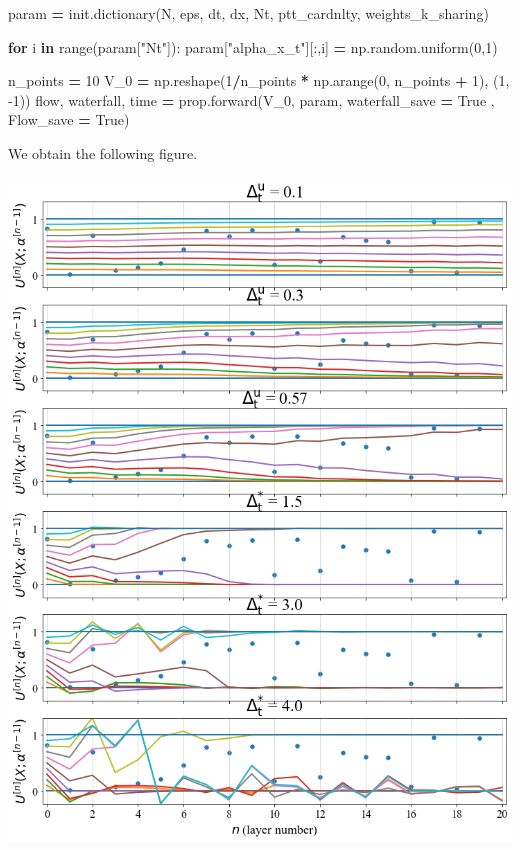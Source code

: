 \documentclass[openany,twoside]{book}
\newenvironment{Shaded}{\begin{snugshade}}{\end{snugshade}}
\newcommand{\BuiltInTok}[1]{#1}
\newcommand{\ControlFlowTok}[1]{\textcolor[rgb]{0.13,0.29,0.53}{\textbf{#1}}}
\newcommand{\DecValTok}[1]{\textcolor[rgb]{0.00,0.00,0.81}{#1}}
\newcommand{\KeywordTok}[1]{\textcolor[rgb]{0.13,0.29,0.53}{\textbf{#1}}}
\newcommand{\NormalTok}[1]{#1}
\newcommand{\OperatorTok}[1]{\textcolor[rgb]{0.81,0.36,0.00}{\textbf{#1}}}
\newcommand{\StringTok}[1]{\textcolor[rgb]{0.31,0.60,0.02}{#1}}
\newcommand{\VariableTok}[1]{\textcolor[rgb]{0.00,0.00,0.00}{#1}}
\begin{document}
\begin{Shaded}
\begin{Highlighting}[]
\NormalTok{param }\OperatorTok{=}\NormalTok{ init.dictionary(N, eps, dt, dx, Nt, ptt_cardnlty, weights_k_sharing)}

\ControlFlowTok{for}\NormalTok{ i }\KeywordTok{in} \BuiltInTok{range}\NormalTok{(param[}\StringTok{"Nt"}\NormalTok{]): param[}\StringTok{"alpha_x_t"}\NormalTok{][:,i] }\OperatorTok{=}\NormalTok{ np.random.uniform(}\DecValTok{0}\NormalTok{,}\DecValTok{1}\NormalTok{)}

\NormalTok{n_points }\OperatorTok{=} \DecValTok{10}    
\NormalTok{V_0 }\OperatorTok{=}\NormalTok{ np.reshape(}\DecValTok{1}\OperatorTok{/}\NormalTok{n_points }\OperatorTok{*}\NormalTok{ np.arange(}\DecValTok{0}\NormalTok{, n_points }\OperatorTok{+} \DecValTok{1}\NormalTok{), (}\DecValTok{1}\NormalTok{, }\DecValTok{-1}\NormalTok{))}
\NormalTok{flow, waterfall, time }\OperatorTok{=}\NormalTok{ prop.forward(V_0, param, waterfall_save }\OperatorTok{=} \VariableTok{True}\NormalTok{ , Flow_save }\OperatorTok{=} \VariableTok{True}\NormalTok{)}
\end{Highlighting}
\end{Shaded}

We obtain the following figure.

\includegraphics{figures/output_16_0.png}
\end{document}
